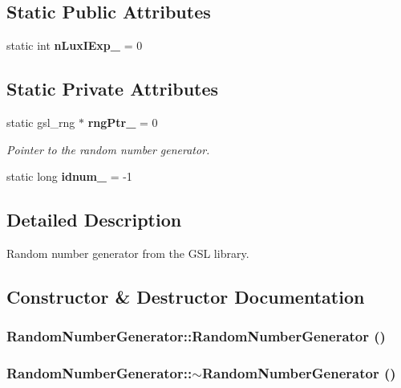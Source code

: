 \subsection*{Static Public Attributes}
\begin{CompactItemize}
\item 
static int {\bf nLuxIExp\_\-} = 0
\end{CompactItemize}
\subsection*{Static Private Attributes}
\begin{CompactItemize}
\item 
static gsl\_\-rng $\ast$ {\bf rngPtr\_\-} = 0
\begin{CompactList}\small\item\em Pointer to the random number generator. \item\end{CompactList}\item 
static long {\bf idnum\_\-} = -1
\end{CompactItemize}


\subsection{Detailed Description}
Random number generator from the GSL library. 

\subsection{Constructor \& Destructor Documentation}
\subsubsection{\setlength{\rightskip}{0pt plus 5cm}RandomNumberGenerator::RandomNumberGenerator ()}\label{classRandomNumberGenerator_8e7e711ea58f13f3ed95becbe33684e9}


\subsubsection{\setlength{\rightskip}{0pt plus 5cm}RandomNumberGenerator::$\sim$RandomNumberGenerator ()}\label{classRandomNumberGenerator_f4949b4234bd8d8283028162f8a8e7f5}




